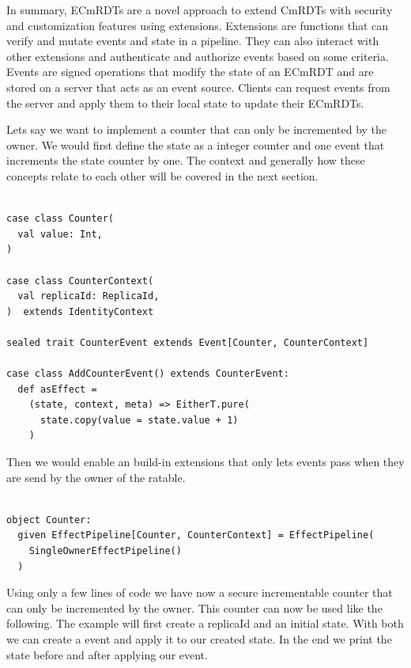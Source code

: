 \documentclass[
	ngerman,
	ruledheaders=section,   %
	class=report,		    %
	thesis={type=bachelor}, %
	accentcolor=9c,			%
	custommargins=true,    %
	marginpar=false,        %
	parskip=half-,          %
	fontsize=11pt,          %
]{tudapub}
\begin{document}
In summary, ECmRDTs are a novel approach to extend CmRDTs with security and customization features using extensions. Extensions are functions that can verify and mutate events and state in a pipeline. They can also interact with other extensions and authenticate and authorize events based on some criteria. Events are signed operations that modify the state of an ECmRDT and are stored on a server that acts as an event source. Clients can request events from the server and apply them to their local state to update their ECmRDTs.


Lets say we want to implement a counter that can only be incremented by the owner. We would first define the state as a integer counter and one event that increments the state counter by one. The context and generally how these concepts relate to each other will be covered in the next section.

\begin{lstlisting}
    
case class Counter(
  val value: Int,
) 

case class CounterContext(
  val replicaId: ReplicaId,
)  extends IdentityContext

sealed trait CounterEvent extends Event[Counter, CounterContext]

case class AddCounterEvent() extends CounterEvent:
  def asEffect =
    (state, context, meta) => EitherT.pure(
      state.copy(value = state.value + 1)
    )

\end{lstlisting}

Then we would enable an build-in extensions that only lets events pass when they are send by the owner of the ratable.

\begin{lstlisting}

object Counter:
  given EffectPipeline[Counter, CounterContext] = EffectPipeline(
    SingleOwnerEffectPipeline()
  )

\end{lstlisting}

Using only a few lines of code we have now a secure incrementable counter that can only be incremented by the owner. This counter can now be used like the following. The example will first create a replicaId and an initial state. With both we can create a event and apply it to our created state. In the end we print the state before and after applying our event.
\end{document}

